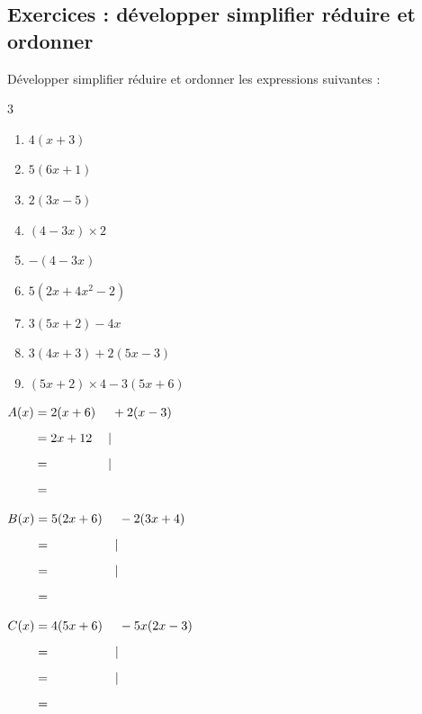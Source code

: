 \documentclass[main.tex]{subfiles}
\begin{document}
\newpage 
{}  
\pagestyle{scrheadings} %
\onehalfspacing
\subsection{Exercices : développer simplifier réduire et ordonner}
\begin{exercise} \label{chap07:exo:simple1} Développer simplifier réduire et ordonner les expressions suivantes :
	\vspace{-0.5em}
\begin{multicols}{3}
	\begin{enumerate}[label={$\Alph*=$},leftmargin=*]
		\item$4\left(x+3\right)$
		\item$5\left(6x+1\right)$
		\item$2\left(3x-5\right)$
		\item$\left(4-3x\right)\times 2$
		\item$-\left(4-3x\right)$
		\item$5\left(2x+4x^2-2\right)$
		\item $3\left(5x+2\right)-4x$
		\item $3\left(4x+3\right)+2\left(5x-3\right)$
		\item $\left(5x+2\right)\times4-3\left(5x+6\right)$
	\end{enumerate}
\end{multicols} 
\end{exercise}
\begin{example}\hfill 
	
	
	
	\noindent\parbox{0.32\linewidth}{	
		$\begin{aligned}
			A (x)  &  =2(x+6)& &+2(x-3) \\
			&  = 2x+12\rule{0pt}{1.3em}&|&  \\
			&  =  \rule{0pt}{1.3em}&|&  \\
			&  =  \rule{0pt}{1.3em}     
		\end{aligned}$  	
	} 
	\hfill  \parbox{0.32\linewidth}{	
		$\begin{aligned}
			B (x)  &  =5(2x+6)& &-2(3x+4) \\
			&  = \rule{0pt}{1.3em}&|&  \\
			&  =  \rule{0pt}{1.3em}&|&  \\
			&  =  \rule{0pt}{1.3em}     
		\end{aligned}$ 
	} \hfill 
	\parbox{0.32\linewidth}{	
		$\begin{aligned}
			C (x)  &  =	4(5x+6)& &-5x(2x-3) \\
			&  = \rule{0pt}{1.3em}&|& \\
			&  =  \rule{0pt}{1.3em}&|&  \\
			&  =  \rule{0pt}{1.3em}     
		\end{aligned}$ 
	}  
	
\end{example}
\end{document}
